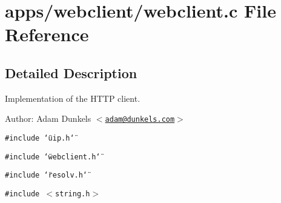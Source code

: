 \hypertarget{a00048}{
\section{apps/webclient/webclient.c File Reference}
\label{a00048}
}


\subsection{Detailed Description}
Implementation of the HTTP client. 

\begin{Desc}
\item[Author:]Adam Dunkels $<$\href{mailto:adam@dunkels.com}{\tt adam@dunkels.com}$>$ \end{Desc}


{\tt \#include \char`\"{}uip.h\char`\"{}}\par
{\tt \#include \char`\"{}webclient.h\char`\"{}}\par
{\tt \#include \char`\"{}resolv.h\char`\"{}}\par
{\tt \#include $<$string.h$>$}\par


